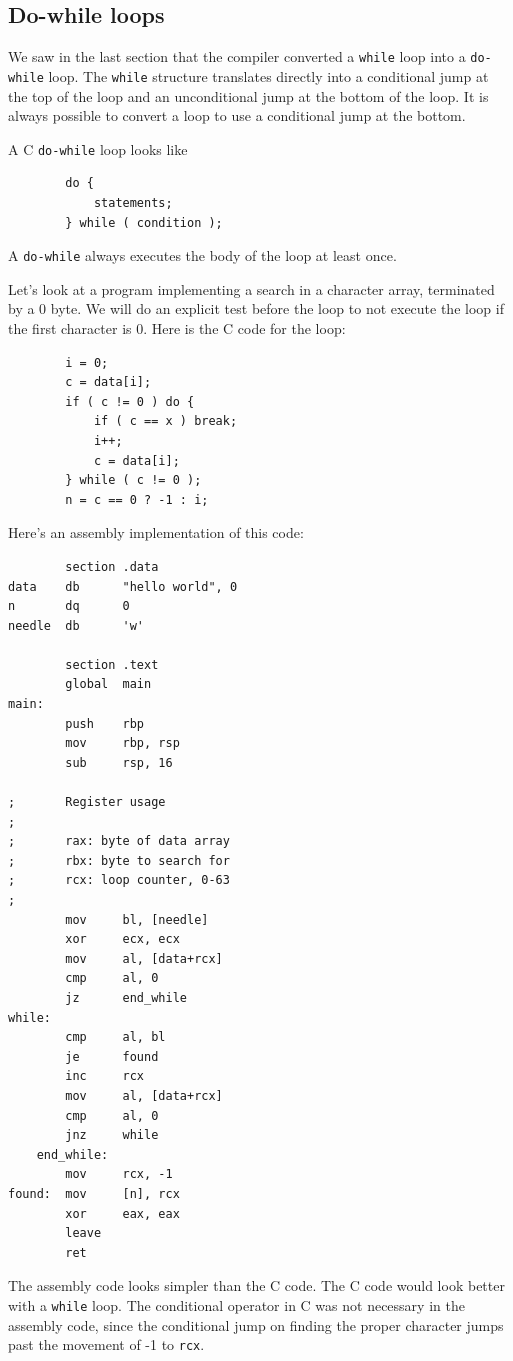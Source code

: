 \documentclass[11pt,b5paper]{book}
\begin{document}
\subsection{Do-while loops}

We saw in the last section that the compiler converted a {\tt while} loop into a {\tt do-while} loop. 
The {\tt while} structure translates directly into a conditional jump at the top of the loop and an
unconditional jump at the bottom of the loop.
It is always possible to convert a loop to use a conditional jump at the bottom.

A C {\tt do-while} loop looks like 
\begin{verbatim}
        do {
            statements;
        } while ( condition );
\end{verbatim}
A {\tt do-while} always executes the body of the loop at least once.

Let's look at a program implementing a search in a character array, terminated by a 0 byte.
We will do an explicit test before the loop to not execute the loop if the first
character is 0.
Here is the C code for the loop:
\begin{verbatim}
        i = 0;
        c = data[i];
        if ( c != 0 ) do {
            if ( c == x ) break;
            i++;
            c = data[i];
        } while ( c != 0 );
        n = c == 0 ? -1 : i;
\end{verbatim}

Here's an assembly implementation of this code:
\begin{verbatim}
        section .data
data    db      "hello world", 0
n       dq      0
needle  db      'w'

        section .text
        global  main
main:
        push    rbp
        mov     rbp, rsp
        sub     rsp, 16

;       Register usage
;
;       rax: byte of data array
;       rbx: byte to search for
;       rcx: loop counter, 0-63
;
        mov     bl, [needle]
        xor     ecx, ecx
        mov     al, [data+rcx]
        cmp     al, 0
        jz      end_while
while:
        cmp     al, bl
        je      found
        inc     rcx
        mov     al, [data+rcx]
        cmp     al, 0
        jnz     while
    end_while:
        mov     rcx, -1
found:  mov     [n], rcx
        xor     eax, eax
        leave
        ret
\end{verbatim}

The assembly code looks simpler than the C code.
The C code would look better with a {\tt while} loop.
The conditional operator in C was not necessary in the assembly code, since
the conditional jump on finding the proper character jumps past the movement of -1 to {\tt rcx}.
\end{document}
